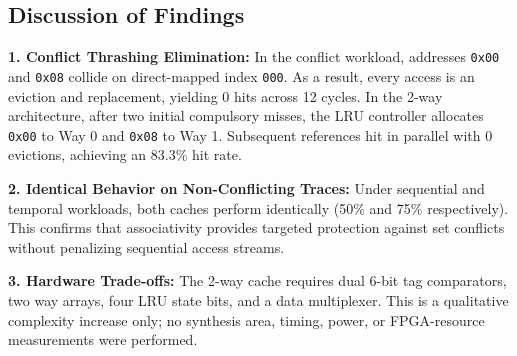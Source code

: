 \documentclass[10pt,twocolumn]{article}
\begin{document}
\begin{table}[htbp]
\centering
\caption{Comparative Architectural Summary}
\label{tab:overall_summary}
\end{table}

\subsection{Discussion of Findings}
\textbf{1. Conflict Thrashing Elimination:} In the conflict workload, addresses \texttt{0x00} and \texttt{0x08} collide on direct-mapped index \texttt{000}. As a result, every access is an eviction and replacement, yielding 0 hits across 12 cycles. In the 2-way architecture, after two initial compulsory misses, the LRU controller allocates \texttt{0x00} to Way 0 and \texttt{0x08} to Way 1. Subsequent references hit in parallel with 0 evictions, achieving an 83.3\% hit rate.

\textbf{2. Identical Behavior on Non-Conflicting Traces:} Under sequential and temporal workloads, both caches perform identically (50\% and 75\% respectively). This confirms that associativity provides targeted protection against set conflicts without penalizing sequential access streams.

\textbf{3. Hardware Trade-offs:} The 2-way cache requires dual 6-bit tag comparators, two way arrays, four LRU state bits, and a data multiplexer. This is a qualitative complexity increase only; no synthesis area, timing, power, or FPGA-resource measurements were performed.
\end{document}
